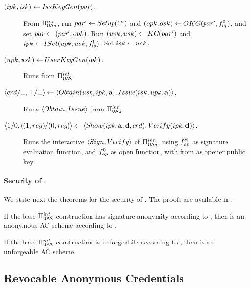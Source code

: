 \begin{description}
\item[$(ipk,isk) \gets IssKeyGen(par)$.] From $\Pi_{\mathsf{UAS}}^{int}$, run $par'
  \gets Setup(1^\kappa)$ and $(opk,osk) \gets OKG(par',
  f_{op}^0)$, and set $par \gets (par',opk)$. Run $(upk,usk) \gets
  KG(par')$ and $ipk \gets ISet(upk,usk,f_{is}^1)$. Set $isk \gets
  usk$.
\item[$(upk,usk) \gets UserKeyGen(ipk)$.] Runs \KeyGen from $\Pi_{\mathsf{UAS}}^{int}$.
\item[$\langle crd/\bot,\top/\bot \rangle \gets
  \langle Obtain(usk,ipk,\mathbf{a}),Issue(isk,upk,\mathbf{a}) \rangle$.]
  Runs $\langle Obtain,Issue \rangle$ from $\Pi_{\mathsf{UAS}}^{int}$.
\item[$\langle 1/0,((1,reg)/(0,reg)\rangle
  \gets \langle Show(ipk,\mathbf{a},\mathbf{d},
  crd),Verify(ipk,\mathbf{d}) \rangle$.]
  Runs the interactive $\langle Sign, Verify\rangle$ of  $\Pi_{\mathsf{UAS}}^{int}$,
  using $f_{ev}^{\mathbf{d}}$ as signature evaluation function, and $f_{op}^0$ as
  open function, with \opk from \parm as opener public key.
\end{description}

\paragraph{Security of \CUASAC.} %
We state next the theorems for the security of \CUASAC. The proofs are
available in .

\begin{theorem}
  \label{thm:anon-cuasac}
  If the base $\Pi_{\mathsf{UAS}}^{int}$ construction has signature anonymity according to
  , then \CUASAC is an anonymous AC scheme
  according to \cite{fhs19}.
\end{theorem}

\begin{theorem}
  \label{thm:forge-cuasac}
  If the base $\Pi_{\mathsf{UAS}}^{int}$ construction is unforgeabile according to
  , then \CUASAC is an unforgeable AC scheme.
\end{theorem}

\subsection{Revocable Anonymous Credentials}
\label{ssec:related-models-rac}

